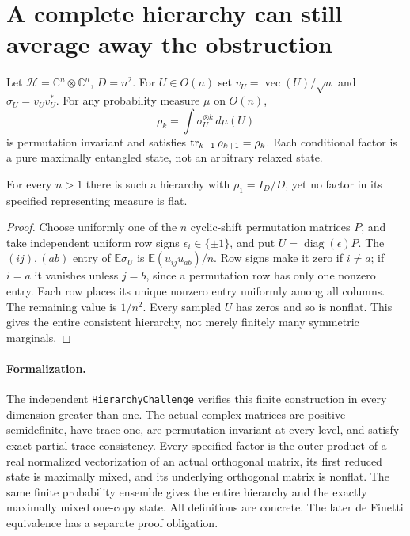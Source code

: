 
\section{A complete hierarchy can still average away the obstruction}
Let $\mathcal H=\mathbb C^n\otimes\mathbb C^n$, $D=n^2$.
For $U\in O(n)$ set $v_U=\operatorname{vec}(U)/\sqrt n$ and
$\sigma_U=v_Uv_U^*$. For any probability measure $\mu$ on $O(n)$,
\[
 \rho_k=\int\sigma_U^{\otimes k}\,d\mu(U)
\]
is permutation invariant and satisfies $\operatorname{tr}_{k+1}\rho_{k+1}=\rho_k$.
Each conditional factor is a pure maximally entangled state, not an
arbitrary relaxed state.
\begin{proposition}
For every $n>1$ there is such a hierarchy with $\rho_1=I_D/D$,
yet no factor in its specified representing measure is flat.
\end{proposition}
\begin{proof}
Choose uniformly one of the $n$ cyclic-shift permutation matrices $P$,
and take independent uniform row
signs $\epsilon_i\in\{\pm1\}$, and put $U=\operatorname{diag}(\epsilon)P$.
The $(ij),(ab)$ entry of $\mathbb E\sigma_U$ is
$\mathbb E(u_{ij}u_{ab})/n$. Row signs make it zero if $i\ne a$;
if $i=a$ it vanishes unless $j=b$, since a permutation row has only
one nonzero entry. Each row places its unique nonzero entry uniformly among all columns. The remaining value is $1/n^2$. Every sampled
$U$ has zeros and so is nonflat. This gives the entire consistent
hierarchy, not merely finitely many symmetric marginals.
\end{proof}
\paragraph{Formalization.}
The independent \texttt{HierarchyChallenge} verifies this finite
construction in every dimension greater than one. The actual complex
matrices are positive semidefinite, have trace one, are permutation
invariant at every level, and satisfy exact partial-trace consistency.
Every specified factor is the outer product of a real normalized
vectorization of an actual orthogonal matrix, its first reduced state
is maximally mixed, and its underlying orthogonal matrix is nonflat.
The same finite probability ensemble gives the entire hierarchy and
the exactly maximally mixed one-copy state. All definitions are
concrete. The later de Finetti equivalence has a separate proof obligation.

